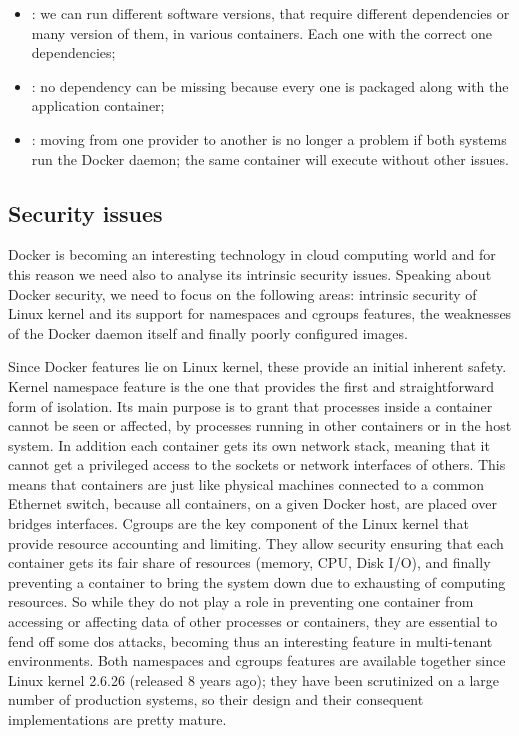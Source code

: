 \begin{itemize}
	\item{: we can run different software versions, that require
		different dependencies or many version of them, in various containers. Each one with
		the correct one dependencies;}
	\item{: no dependency can be missing because every one is packaged
		along with the application container;}
	\item{: moving from one provider to another is no longer a
		problem if both systems run the Docker daemon; the same container will execute without other
		issues.}
\end{itemize}

\subsection{Security issues}
\label{sec:problemSpace-docker-security}
Docker is becoming an interesting technology in cloud computing world and for this reason we need also
to analyse its intrinsic security issues. Speaking about Docker security, we need to focus on the following
areas: intrinsic security of Linux kernel and its support for namespaces and cgroups features, the weaknesses
of the Docker daemon itself and finally poorly configured images.

Since Docker features lie on Linux kernel, these provide an initial inherent safety. Kernel namespace
feature is the one that provides the first and straightforward form of isolation. Its main purpose is
to grant that processes inside a container cannot be seen or affected, by processes running
in other containers or in the host system. In addition each container gets its own network stack, meaning
that it cannot get a privileged access to the sockets or network interfaces of others. This means that
containers are just like physical machines connected to a common Ethernet switch, because all containers, on
a given Docker host, are placed over bridges interfaces. Cgroups are the key component of the Linux kernel
that provide resource accounting and limiting. They allow security ensuring that each container gets its fair
share of resources (memory, CPU, Disk I/O), and finally preventing a container to bring the system down due to
exhausting of computing resources. So while they do not play a role in preventing one container from accessing or
affecting data of other processes or containers, they are essential to fend off some \ac{dos} attacks, becoming
thus an interesting feature in multi-tenant environments. Both namespaces and cgroups features are available
together since Linux kernel 2.6.26 (released 8 years ago); they have been scrutinized on a large number of
production systems, so their design and their consequent implementations are pretty mature.

